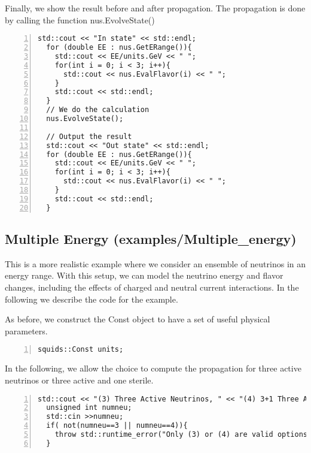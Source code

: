 \documentclass[3p,12pt]{elsarticle}
\newcommand{\ttf}{\ttfamily}
\begin{document}
Finally, we show the result before and after propagation. The
propagation is done by calling the function {\ttf nus.EvolveState()}

\begin{lstlisting}[frame=leftline, numbers = left,breaklines=true, label = ex:sin1,firstnumber=last]
  std::cout << "In state" << std::endl;
  for (double EE : nus.GetERange()){
    std::cout << EE/units.GeV << " ";
    for(int i = 0; i < 3; i++){
      std::cout << nus.EvalFlavor(i) << " ";
    }
    std::cout << std::endl;
  }
  // We do the calculation                                                                                  
  nus.EvolveState();
  
  // Output the result                                                                                 
  std::cout << "Out state" << std::endl;
  for (double EE : nus.GetERange()){
    std::cout << EE/units.GeV << " ";
    for(int i = 0; i < 3; i++){
      std::cout << nus.EvalFlavor(i) << " ";
    }
    std::cout << std::endl;
  }
\end{lstlisting}


\subsection{Multiple Energy \textnormal{({\ttf examples/Multiple\_energy})}}
This is a more realistic example where we consider an ensemble of
neutrinos in an energy range. With this setup,
we can model the neutrino energy and flavor changes, 
including the effects of charged and neutral current interactions.
In the following we describe the code for the example.

As before, we construct the {\ttf Const} object to have a set of useful physical parameters.
\begin{lstlisting}[frame=leftline, numbers = left,breaklines=true, label = ex:sin1]
  squids::Const units;
\end{lstlisting}

In the following, we allow the choice to compute
the propagation for three active neutrinos or three active and one sterile.

\begin{lstlisting}[frame=leftline, numbers = left,breaklines=true, label = ex:sin1,firstnumber=last]
  std::cout << "(3) Three Active Neutrinos, " << "(4) 3+1 Three Active and One Sterile Neutrino" << std::endl;
  unsigned int numneu;
  std::cin >>numneu;
  if( not(numneu==3 || numneu==4)){
    throw std::runtime_error("Only (3) or (4) are valid options");
  }
\end{lstlisting}
\end{document}
